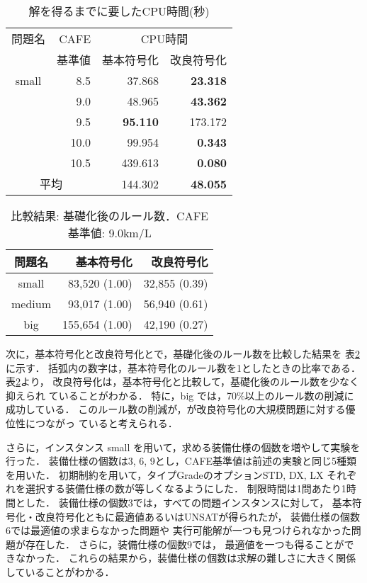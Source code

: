 \begin{table}[tbp]
 \caption{解を得るまでに要したCPU時間(秒)}
 \centering
 \begin{tabular}{c|r|rr}\bhline
  問題名 & CAFE  & \multicolumn{2}{c}{CPU時間} \\ \cline{3-4}   
        & 基準値 & 基本符号化  & 改良符号化 \\ \hline
  small & 8.5  & 37.868          & \textbf{23.318}   \\
  	& 9.0  & 48.965          & \textbf{43.362}   \\
  	& 9.5  & \textbf{95.110} & 173.172           \\
  	& 10.0 & 99.954          & \textbf{0.343}    \\
  	& 10.5 & 439.613         & \textbf{0.080}    \\ \hline \hline
  \multicolumn{2}{c}{平均}  & 144.302         & \textbf{48.055}   \\ \hline
 \end{tabular}
 \label{tab:cpu_time}
\end{table}
\begin{table}[tb]
 \caption{比較結果: 基礎化後のルール数．CAFE基準値: 9.0km/L}
 \centering
 \begin{tabular}{crr} \bhline
  問題名    & 基本符号化    & 改良符号化    \\ \hline
  small	    &  83,520 (1.00)  & 32,855 (0.39) \\ 
  medium    &  93,017 (1.00)  & 56,940 (0.61) \\
  big	    & 155,654 (1.00)  & 42,190 (0.27) \\ \hline
 \end{tabular}
 \label{tab:rule}
\end{table}

次に，基本符号化と改良符号化とで，基礎化後のルール数を比較した結果を
表\ref{tab:rule}に示す．
括弧内の数字は，基本符号化のルール数を1としたときの比率である．
表\ref{tab:rule}より，
改良符号化は，基本符号化と比較して，基礎化後のルール数を少なく抑えられ
ていることがわかる．
特に，big では，70\%以上のルール数の削減に成功している．
このルール数の削減が，が改良符号化の大規模問題に対する優位性につながっ
ていると考えられる．

さらに，インスタンス small を用いて，求める装備仕様の個数を増やして実験を行った．
装備仕様の個数は3, 6, 9とし，CAFE基準値は前述の実験と同じ5種類を用いた．
初期制約を用いて，タイプ\textsf{Grade}のオプション\textsf{STD, DX, LX}
それぞれを選択する装備仕様の数が等しくなるようにした．
制限時間は1問あたり1時間とした．
装備仕様の個数3では，すべての問題インスタンスに対して，
基本符号化・改良符号化ともに最適値あるいはUNSATが得られたが，
装備仕様の個数6では最適値の求まらなかった問題や
実行可能解が一つも見つけられなかった問題が存在した．
さらに，装備仕様の個数9では，
最適値を一つも得ることができなかった．
これらの結果から，装備仕様の個数は求解の難しさに大きく関係していることがわかる．





